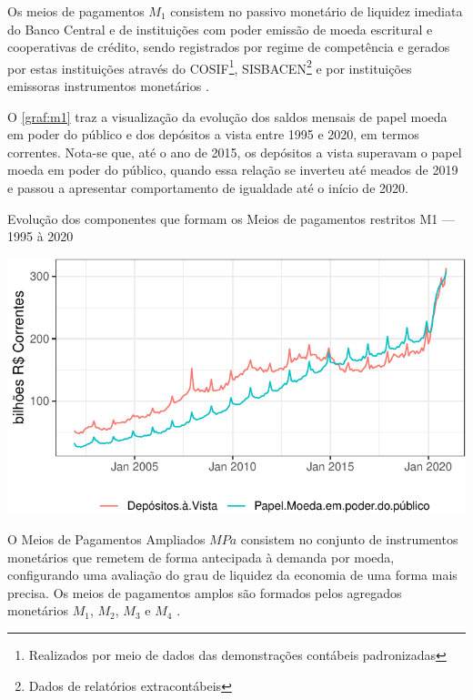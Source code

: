\documentclass[
  12pt,
  12pt,
  openright,
  oneside,
  a4paper,
  chapter=TITLE,
  section=TITLE,
  subsection=TITLE,
  subsubsection=TITLE,
  portugues,
  sumario=tradicional]{abntex2}
\begin{document}
Os meios de pagamentos \(M_1\) consistem no passivo monetário de liquidez imediata do Banco Central e de instituições com poder emissão de moeda escritural e cooperativas de crédito, sendo registrados por regime de competência e gerados por estas instituições através do COSIF\footnote{ Realizados por meio de dados das demonstrações contábeis padronizadas}, SISBACEN\footnote{Dados de relatórios extracontábeis} e por instituições emissoras instrumentos monetários \cite{sgs:m1, sgs:mpa}.

O \autoref{graf:m1} traz a visualização da evolução dos saldos mensais de papel moeda em poder do público e dos depósitos a vista entre 1995 e 2020, em termos correntes. Nota-se que, até o ano de 2015, os depósitos a vista superavam o papel moeda em poder do público, quando essa relação se inverteu até meados de 2019 e passou a apresentar comportamento de igualdade até o início de 2020.

\begin{grafico}[!hbtp]
\vspace{20pt}
\caption{Evolução dos componentes que formam os Meios de pagamentos restritos M1 — 1995 à 2020}
\vspace{-4mm}

\begin{center}\includegraphics{12-exportedfigures/m1-1} \end{center}
\vspace{-3mm}
\label{graf:m1}
\vspace{-2mm}
\end{grafico}

O Meios de Pagamentos Ampliados \(MPa\) consistem no conjunto de instrumentos monetários que remetem de forma antecipada à demanda por moeda, configurando uma avaliação do grau de liquidez da economia de uma forma mais precisa. Os meios de pagamentos amplos são formados pelos agregados monetários \(M_1\), \(M_2\), \(M_3\) e \(M_4\) \cite{sgs:mpa}.
\end{document}
